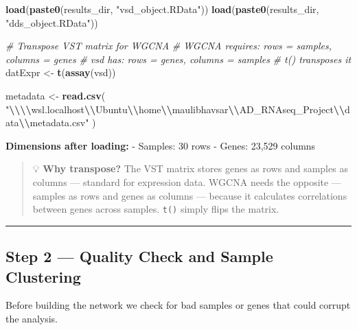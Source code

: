 \documentclass[
]{article}
\newenvironment{Shaded}{\begin{snugshade}}{\end{snugshade}}
\newcommand{\CommentTok}[1]{\textcolor[rgb]{0.56,0.35,0.01}{\textit{#1}}}
\newcommand{\FunctionTok}[1]{\textcolor[rgb]{0.13,0.29,0.53}{\textbf{#1}}}
\newcommand{\NormalTok}[1]{#1}
\newcommand{\OtherTok}[1]{\textcolor[rgb]{0.56,0.35,0.01}{#1}}
\newcommand{\SpecialCharTok}[1]{\textcolor[rgb]{0.81,0.36,0.00}{\textbf{#1}}}
\newcommand{\StringTok}[1]{\textcolor[rgb]{0.31,0.60,0.02}{#1}}
\begin{document}
\begin{Shaded}
\begin{Highlighting}[]
\FunctionTok{load}\NormalTok{(}\FunctionTok{paste0}\NormalTok{(results\_dir, }\StringTok{"vsd\_object.RData"}\NormalTok{))}
\FunctionTok{load}\NormalTok{(}\FunctionTok{paste0}\NormalTok{(results\_dir, }\StringTok{"dds\_object.RData"}\NormalTok{))}

\CommentTok{\# Transpose VST matrix for WGCNA}
\CommentTok{\# WGCNA requires: rows = samples, columns = genes}
\CommentTok{\# vsd has: rows = genes, columns = samples}
\CommentTok{\# t() transposes it}
\NormalTok{datExpr }\OtherTok{\textless{}{-}} \FunctionTok{t}\NormalTok{(}\FunctionTok{assay}\NormalTok{(vsd))}

\NormalTok{metadata }\OtherTok{\textless{}{-}} \FunctionTok{read.csv}\NormalTok{(}
    \StringTok{"}\SpecialCharTok{\textbackslash{}\textbackslash{}\textbackslash{}\textbackslash{}}\StringTok{wsl.localhost}\SpecialCharTok{\textbackslash{}\textbackslash{}}\StringTok{Ubuntu}\SpecialCharTok{\textbackslash{}\textbackslash{}}\StringTok{home}\SpecialCharTok{\textbackslash{}\textbackslash{}}\StringTok{maulibhavsar}\SpecialCharTok{\textbackslash{}\textbackslash{}}\StringTok{AD\_RNAseq\_Project}\SpecialCharTok{\textbackslash{}\textbackslash{}}\StringTok{data}\SpecialCharTok{\textbackslash{}\textbackslash{}}\StringTok{metadata.csv"}
\NormalTok{)}
\end{Highlighting}
\end{Shaded}

\textbf{Dimensions after loading:} - Samples: 30 rows - Genes: 23,529
columns

\begin{quote}
💡 \textbf{Why transpose?} The VST matrix stores genes as rows and
samples as columns --- standard for expression data. WGCNA needs the
opposite --- samples as rows and genes as columns --- because it
calculates correlations between genes across samples. \texttt{t()}
simply flips the matrix.
\end{quote}

\begin{center}\rule{0.5\linewidth}{0.5pt}\end{center}

\subsection{Step 2 --- Quality Check and Sample
Clustering}\label{step-2-quality-check-and-sample-clustering}

Before building the network we check for bad samples or genes that could
corrupt the analysis.
\end{document}
